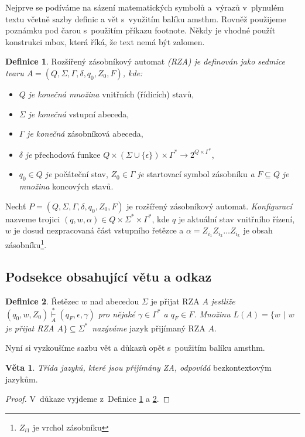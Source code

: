 \documentclass[11pt, a4paper, twocolumn]{article}
\theoremstyle{definition}
\newtheorem{d1}{Definice}
\newtheorem{v1}{Věta}
\begin{document}
Nejprve se podíváme na sázení matematických symbolů
a~výrazů v~plynulém textu včetně sazby definic a vět s~využitím 
balíku {\selectfont amsthm}. Rovněž použijeme poznámku pod
čarou s~použitím příkazu {\selectfont
{}footnote}. Někdy je vhodné
použít konstrukci {\selectfont
{}mbox}, která říká, že text nemá být
zalomen.
\begin{d1}
\label{def1}
Rozšířený zásobníkový automat \textit{(RZA) je de\-finován jako sedmice tvaru $A = (Q, \Sigma, \Gamma, \delta, q_0, Z_0, F)$,
kde:}
\begin{itemize}
    \item $Q$\textit{ je konečná množina} vnitřních (řídicích) stavů,
    \item $\Sigma$ \textit{je konečná} vstupní abeceda,
    \item $\Gamma$ \textit{je konečná} zásobníková abeceda,
    \item $\delta$ \textit{je} přechodová funkce $Q \times (\Sigma \cup \{\epsilon\})\times\Gamma^\ast\rightarrow 2^{Q\times\Gamma^*}$,
    \item $q_0 \in Q$ \textit{je} počáteční stav, $Z_0 \in \Gamma$ \textit{je} startovací symbol zásobníku \emph{a} $F \subseteq Q$ \textit{je množina} koncových stavů.
\end{itemize}

Nechť $P=(Q, \Sigma, \Gamma, \delta, q_0, Z_0, F)$ je rozšířený zásobníkový automat. \textit{Konfigurací} nazveme trojici $(q, w, \alpha) \in Q \times \Sigma^* \times \Gamma^*$, kde $q$ je aktuální stav vnitřního řízení, $w$ je dosud nezpracovaná část vstupního řetězce a $\alpha =
Z_{i_1}Z_{i_2}
\dots Z_{i_k}$
je obsah zásobníku\footnote{$Z_{i1}$ je vrchol zásobníku}.
\subsection{Podsekce obsahující větu a odkaz}
\end{d1}

\begin{d1}
\label{def2}
Řetězec $w$ nad abecedou $\Sigma$ je přijat RZA
$A$ \textit{jestliže $(q_0, w, Z_0)\overset{*}{\underset{A}{\vdash}}(q_F, \epsilon, \gamma)$ pro nějaké $\gamma\in \Gamma^*$ a $q_F \in F$. Množinu $L(A) = \{w$ $|$ $w$ je přijat RZA $A\} \subseteq \Sigma^*$~nazýváme} jazyk přijímaný RZA $A$.
\end{d1}

Nyní si vyzkoušíme sazbu vět a důkazů opět s~použitím
balíku {\selectfont amsthm}.
\begin{v1}
\textit{Třída jazyků, které jsou přijímány ZA, odpovídá}
bezkontextovým jazykům.
\end{v1}
\begin{proof}
V~důkaze vyjdeme z~Definice \ref{def1} a \ref{def2}.
\end{proof}
\end{document}
